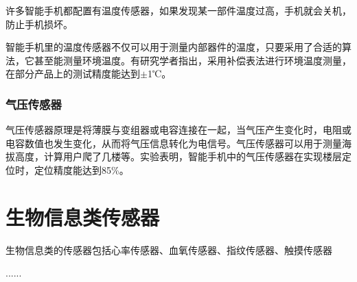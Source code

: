 \documentclass[lang=cn]{elegantpaper}
\begin{document}
许多智能手机都配置有温度传感器，如果发现某一部件温度过高，手机就会关机，防止手机损坏。

智能手机里的温度传感器不仅可以用于测量内部器件的温度，只要采用了合适的算法，它甚至能测量环境温度。有研究学者指出，采用补偿表法进行环境温度测量，在部分产品上的测试精度能达到$\pm$1℃\cite{Temperature}。

\subsubsection{气压传感器}

气压传感器原理是将薄膜与变组器或电容连接在一起，当气压产生变化时，电阻或电容数值也发生变化，从而将气压信息转化为电信号。气压传感器可以用于测量海拔高度，计算用户爬了几楼等。实验表明，智能手机中的气压传感器在实现楼层定位时，定位精度能达到85\%\cite{storeyDetect}。


\section{生物信息类传感器}

生物信息类的传感器包括心率传感器、血氧传感器、指纹传感器、触摸传感器

......

% 

\end{document}
